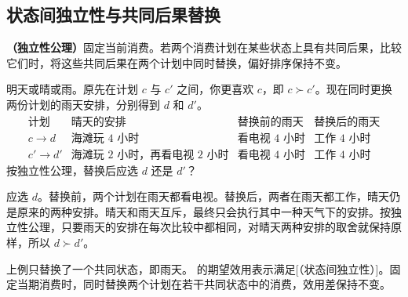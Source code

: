\subsection{状态间独立性与共同后果替换}\label{sec:wj-six-independence}
\begin{tcolorbox}[knowledge]
\textbf{（独立性公理）}固定当前消费。若两个消费计划在某些状态上具有共同后果，比较它们时，将这些共同后果在两个计划中同时替换，偏好排序保持不变。
\end{tcolorbox}
\begin{tcolorbox}[example]
\begin{question}
明天或晴或雨。原先在计划 $c$ 与 $c'$ 之间，你更喜欢 $c$，即 $c\succ c'$。现在同时更换两份计划的雨天安排，分别得到 $d$ 和 $d'$。
\[
\begin{array}{c|lll}
 \text{计划}&\text{晴天的安排}&\text{替换前的雨天}&\text{替换后的雨天}\\\hline
 c\to d  &\text{海滩玩 $4$ 小时}&\text{看电视 $4$ 小时}&\text{工作 $4$ 小时}\\
 c'\to d'&\text{海滩玩 $2$ 小时，再看电视 $2$ 小时}&\text{看电视 $4$ 小时}&\text{工作 $4$ 小时}
\end{array}
\]
按独立性公理，替换后应选 $d$ 还是 $d'$？
\end{question}
\begin{solution}[blank-type=manual,blank-vsep=3\baselineskip]
应选 $d$。替换前，两个计划在雨天都看电视。替换后，两者在雨天都工作，晴天仍是原来的两种安排。晴天和雨天互斥，最终只会执行其中一种天气下的安排。按独立性公理，只要雨天的安排在每次比较中都相同，对晴天两种安排的取舍就保持原样，所以 $d\succ d'$。
\end{solution}
\end{tcolorbox}

上例只替换了一个共同状态，即雨天。 的期望效用表示满足[（状态间独立性）]。固定当期消费时，同时替换两个计划在若干共同状态中的消费，效用差保持不变。

